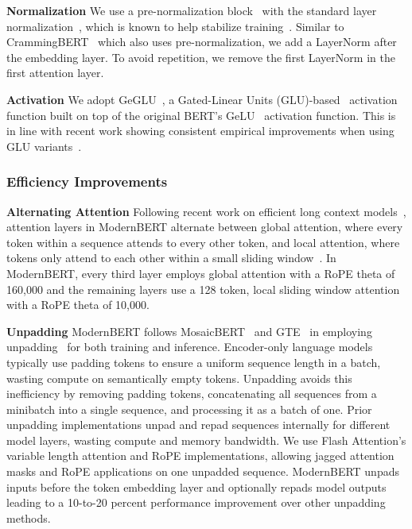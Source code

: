 \documentclass[11pt]{article}
\begin{document}
\textbf{Normalization} We use a pre-normalization block~\cite{DBLP:conf/icml/XiongYHZZXZLWL20} with the standard layer normalization~\cite{layernorm}, which is known to help stabilize training~\cite{DBLP:conf/icml/XiongYHZZXZLWL20}. Similar to CrammingBERT~\cite{crammingbert} which also uses pre-normalization, we add a LayerNorm after the embedding layer. To avoid repetition, we remove the first LayerNorm in the first attention layer.

\textbf{Activation} We adopt GeGLU~\cite{shazeerglu}, a Gated-Linear Units (GLU)-based~\cite{pmlr-v70-dauphin17a} activation function built on top of the original BERT's GeLU~\cite{hendrycks2016gaussian} activation function. This is in line with recent work showing consistent empirical improvements when using GLU variants~\cite{shazeerglu,crammingbert}.

\subsubsection{Efficiency Improvements}
\label{sec:efficiency}

\textbf{Alternating Attention} Following recent work on efficient long context models~\cite{gemma2}, attention layers in ModernBERT alternate between global attention, where every token within a sequence attends to every other token, and local attention, where tokens only attend to each other within a small sliding window~\cite{longformer}. In ModernBERT, every third layer employs global attention with a RoPE theta of 160,000 and the remaining layers use a 128 token, local sliding window attention with a RoPE theta of 10,000.

\textbf{Unpadding} ModernBERT follows MosaicBERT~\cite{mosaic} and GTE~\cite{gte} in employing unpadding~\cite{unpadding} for both training and inference. Encoder-only language models typically use padding tokens to ensure a uniform sequence length in a batch, wasting compute on semantically empty tokens. Unpadding avoids this inefficiency by removing padding tokens, concatenating all sequences from a minibatch into a single sequence, and processing it as a batch of one. Prior unpadding implementations unpad and repad sequences internally for different model layers, wasting compute and memory bandwidth. We use Flash Attention's variable length attention and RoPE implementations, allowing jagged attention masks and RoPE applications on one unpadded sequence. ModernBERT unpads inputs before the token embedding layer and optionally repads model outputs leading to a 10-to-20 percent performance improvement over other unpadding methods.
\end{document}

